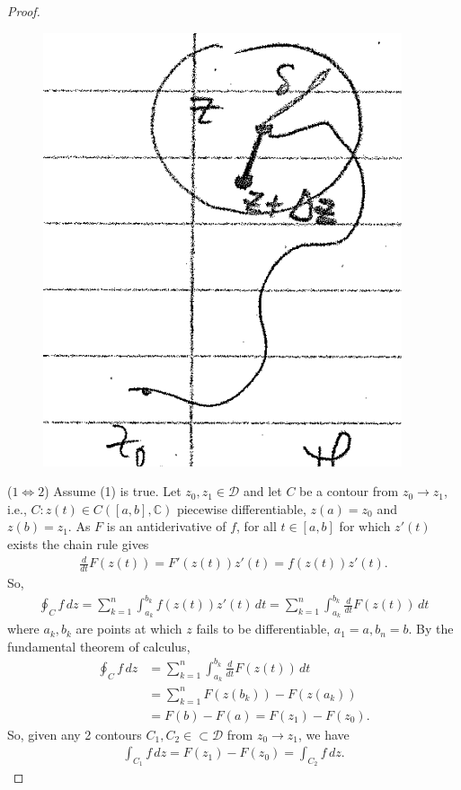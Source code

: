 \documentclass{article}
\theoremstyle{definition}
\newcommand{\f}[2]{\frac{#1}{#2}}
\newcommand{\C}{\mathbb{C}}
\newcommand{\nn}{\nonumber}
\begin{document}
\begin{proof}
	
	
	\begin{figure}[!htb]
		\centering
		\includegraphics[scale=0.25]{tfae}
	\end{figure}
	
	
	($1\iff 2$) Assume (1) is true. Let $z_0, z_1 \in \mathcal{D}$ and let $C$ be a contour from $z_0 \to z_1$, i.e., $C: z(t) \in C([a,b],\C)$ piecewise differentiable, $z(a) = z_0$ and $z(b)= z_1$. As $F$ is an antiderivative of $f$, for all $t\in [a,b]$ for which $z'(t)$ exists the chain rule gives 
	\begin{align}
	\f{d}{dt}F(z(t)) = F'(z(t))z'(t) = f(z(t))z'(t).
	\end{align}
	So,
	\begin{align}
	\oint_C f\,dz = \sum^n_{k=1}\int^{b_k}_{a_k}f(z(t))z'(t)\,dt = \sum^n_{k=1}\int^{b_k}_{a_k} \f{d}{dt}F(z(t))\,dt
	\end{align}
	where $a_k ,b_k$ are points at which $z$ fails to be differentiable, $a_1 = a, b_n = b$. By the fundamental theorem of calculus,
	\begin{align}
	\oint_C f\,dz &=\sum^n_{k=1}\int^{b_k}_{a_k} \f{d}{dt}F(z(t))\,dt\nn\\
	&= \sum^n_{k=1}F(z(b_k)) - F(z(a_k)) \nn\\
	&= F(b) - F(a) = F(z_1) - F(z_0).
	\end{align}
	So, given any 2 contours $C_1, C_2 \in \subset \mathcal{D}$ from $z_0 \to z_1$, we have
	\begin{align}
	\int_{C_1}f\,dz = F(z_1) - F(z_0) = \int_{C_2}f\,dz.
	\end{align}
	

\end{proof}
\end{document}
